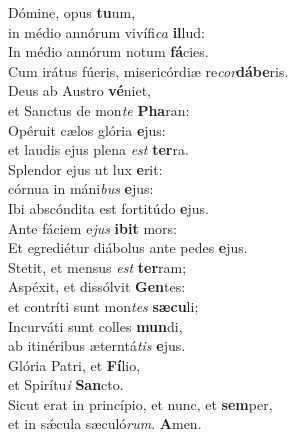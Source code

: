 \evenverse Dómine, opus \textbf{tu}um,~\*\\
\evenverse in médio annórum vivífi\textit{ca} \textbf{il}lud:\\
\oddverse In médio annórum notum \textbf{fá}cies.~\*\\
\oddverse Cum irátus fúeris, misericórdiæ re\textit{cor}\textbf{dá}\textbf{be}ris.\\
\evenverse Deus ab Austro \textbf{vé}niet,~\*\\
\evenverse et Sanctus de mon\textit{te} \textbf{Pha}ran:\\
\oddverse Opéruit cælos glória \textbf{e}jus:~\*\\
\oddverse et laudis ejus plena \textit{est} \textbf{ter}ra.\\
\evenverse Splendor ejus ut lux \textbf{e}rit:~\*\\
\evenverse córnua in máni\textit{bus} \textbf{e}jus:\\
\oddverse Ibi abscóndita est fortitúdo \textbf{e}jus.~\*\\
\oddverse Ante fáciem e\textit{jus} \textbf{i}\textbf{bit} mors:\\
\evenverse Et egrediétur diábolus ante pedes \textbf{e}jus.~\*\\
\evenverse Stetit, et mensus \textit{est} \textbf{ter}ram;\\
\oddverse Aspéxit, et dissólvit \textbf{Gen}tes:~\*\\
\oddverse et contríti sunt mon\textit{tes} \textbf{sæ}\textbf{cu}li;\\
\evenverse Incurváti sunt colles \textbf{mun}di,~\*\\
\evenverse ab itinéribus æterntá\textit{tis} \textbf{e}jus.\\
\oddverse Glória Patri, et \textbf{Fí}lio,~\*\\
\oddverse et Spirítu\textit{i} \textbf{San}cto.\\
\evenverse Sicut erat in princípio, et nunc, et \textbf{sem}per,~\*\\
\evenverse et in sǽcula sæculó\textit{rum}. \textbf{A}men.\\
